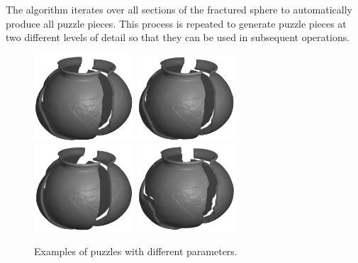 \documentclass[acmlarge,screen,dvipsnames]{acmart}
\begin{document}
%

The algorithm iterates over all sections of the fractured sphere to
automatically produce all puzzle pieces. This process is repeated to
generate puzzle pieces at two different levels of detail so that they
can be used in subsequent operations.
  
\begin{figure}[htb]    
     \centering
         {\includegraphics[width=0.33\textwidth]{images/pott1}}
        {\includegraphics[width=0.33\textwidth]{images/pott2}}
        {\includegraphics[width=0.33\textwidth]{images/pott3}}
        {\includegraphics[width=0.33\textwidth]{images/pott5}}
      \caption{\label{fig:pot-with-different-fracture-settings}%
        Examples of puzzles with different parameters.}
\end{figure}
\end{document}

